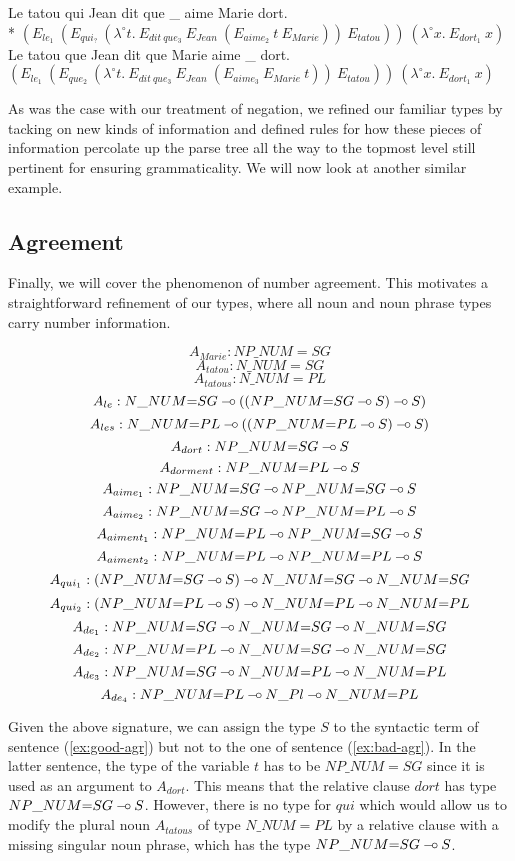 \begin{exe}
  \ex * \label{ex:bad-ext} Le tatou qui Jean dit que \_ aime Marie dort. \\
      * $(E_{le_1}\ (E_{qui_?}\ (\lambda^{\circ} t.\ E_{dit\ que_3}\ E_{Jean}\ (E_{aime_2}\ t\ E_{Marie}))\ E_{tatou}))\ (\lambda^{\circ} x.\ E_{dort_1}\ x)$
  \ex \label{ex:good-ext} Le tatou que Jean dit que Marie aime \_ dort. \\
      $(E_{le_1}\ (E_{que_2}\ (\lambda^{\circ} t.\ E_{dit\ que_3}\ E_{Jean}\ (E_{aime_3}\ E_{Marie}\ t))\ E_{tatou}))\ (\lambda^{\circ} x.\ E_{dort_1}\ x)$
\end{exe}

As was the case with our treatment of negation, we refined our familiar
types by tacking on new kinds of information and defined rules for how
these pieces of information percolate up the parse tree all the way to
the topmost level still pertinent for ensuring grammaticality. We will
now look at another similar example.


\subsection{Agreement}

Finally, we will cover the phenomenon of number agreement. This
motivates a straightforward refinement of our types, where all noun and
noun phrase types carry number information.

$$
A_{Marie} : NP\_NUM{=}SG
$$
$$
A_{tatou} : N\_NUM{=}SG
$$
$$
A_{tatous} : N\_NUM{=}PL
$$
$$
A_{le} : N\_NUM{=}SG \mathbin{{-}\mkern-3.5mu{\circ}} ((NP\_NUM{=}SG \mathbin{{-}\mkern-3.5mu{\circ}} S) \mathbin{{-}\mkern-3.5mu{\circ}} S)
$$
$$
A_{les} : N\_NUM{=}PL \mathbin{{-}\mkern-3.5mu{\circ}} ((NP\_NUM{=}PL \mathbin{{-}\mkern-3.5mu{\circ}} S) \mathbin{{-}\mkern-3.5mu{\circ}} S)
$$
$$
A_{dort} : NP\_NUM{=}SG \mathbin{{-}\mkern-3.5mu{\circ}} S
$$
$$
A_{dorment} : NP\_NUM{=}PL \mathbin{{-}\mkern-3.5mu{\circ}} S
$$
$$
A_{aime_1} : NP\_NUM{=}SG \mathbin{{-}\mkern-3.5mu{\circ}} NP\_NUM{=}SG \mathbin{{-}\mkern-3.5mu{\circ}} S
$$
$$
A_{aime_2} : NP\_NUM{=}SG \mathbin{{-}\mkern-3.5mu{\circ}} NP\_NUM{=}PL \mathbin{{-}\mkern-3.5mu{\circ}} S
$$
$$
A_{aiment_1} : NP\_NUM{=}PL \mathbin{{-}\mkern-3.5mu{\circ}} NP\_NUM{=}SG \mathbin{{-}\mkern-3.5mu{\circ}} S
$$
$$
A_{aiment_2} : NP\_NUM{=}PL \mathbin{{-}\mkern-3.5mu{\circ}} NP\_NUM{=}PL \mathbin{{-}\mkern-3.5mu{\circ}} S
$$
$$
A_{qui_1} : (NP\_NUM{=}SG \mathbin{{-}\mkern-3.5mu{\circ}} S) \mathbin{{-}\mkern-3.5mu{\circ}} N\_NUM{=}SG \mathbin{{-}\mkern-3.5mu{\circ}} N\_NUM{=}SG
$$
$$
A_{qui_2} : (NP\_NUM{=}PL \mathbin{{-}\mkern-3.5mu{\circ}} S) \mathbin{{-}\mkern-3.5mu{\circ}} N\_NUM{=}PL \mathbin{{-}\mkern-3.5mu{\circ}} N\_NUM{=}PL
$$
$$
A_{de_1} : NP\_NUM{=}SG \mathbin{{-}\mkern-3.5mu{\circ}} N\_NUM{=}SG \mathbin{{-}\mkern-3.5mu{\circ}} N\_NUM{=}SG
$$
$$
A_{de_2} : NP\_NUM{=}PL \mathbin{{-}\mkern-3.5mu{\circ}} N\_NUM{=}SG \mathbin{{-}\mkern-3.5mu{\circ}} N\_NUM{=}SG
$$
$$
A_{de_3} : NP\_NUM{=}SG \mathbin{{-}\mkern-3.5mu{\circ}} N\_NUM{=}PL \mathbin{{-}\mkern-3.5mu{\circ}} N\_NUM{=}PL
$$
$$
A_{de_4} : NP\_NUM{=}PL \mathbin{{-}\mkern-3.5mu{\circ}} N\_Pl \mathbin{{-}\mkern-3.5mu{\circ}} N\_NUM{=}PL
$$


Given the above signature, we can assign the type $S$ to the syntactic
term of sentence (\ref{ex:good-agr}) but not to the one of sentence
(\ref{ex:bad-agr}). In the latter sentence, the type of the variable $t$
has to be $NP\_NUM{=}SG$ since it is used as an argument to $A_{dort}$. This
means that the relative clause $dort$ has type $NP\_NUM{=}SG \mathbin{{-}\mkern-3.5mu{\circ}}
S$. However, there is no type for $qui$ which would allow us to modify
the plural noun $A_{tatous}$ of type $N\_NUM{=}PL$ by a relative clause with a
missing singular noun phrase, which has the type $NP\_NUM{=}SG \mathbin{{-}\mkern-3.5mu{\circ}} S$.

